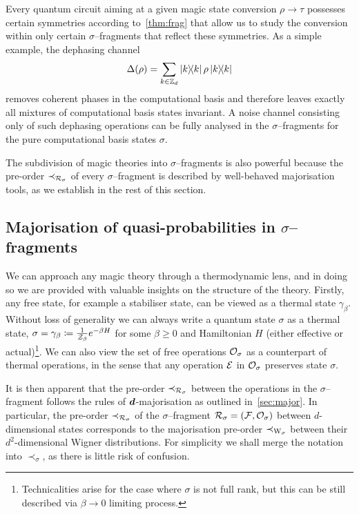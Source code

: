 \documentclass[pra,
aps,
twocolumn,
superscriptaddress,
groupedaddress,
nofootinbib,
reprint
]{revtex4-1}
\begin{document}
Every  quantum circuit aiming at a given magic state conversion $\rho \longrightarrow \tau$ possesses certain symmetries according to~\cref{thm:frag} that allow us to study the conversion within only certain $\sigma$--fragments that reflect these symmetries.
As a simple example, the dephasing channel
\begin{equation}\label{eq:dephase}
	\Delta(\rho) = \sum_{k \in \mathbb{Z}_d} \ketbra{k}{k}\rho\ketbra{k}{k}
\end{equation}
removes coherent phases in the computational basis and therefore leaves exactly all mixtures of computational basis states invariant.
A noise channel consisting only of such dephasing operations can be fully analysed in the $\sigma$--fragments for the pure computational basis states $\sigma$. 

The subdivision of magic theories into $\sigma$--fragments is also powerful because the pre-order $\prec_{\mathcal{R}_\sigma}$ of every $\sigma$--fragment is described by well-behaved majorisation tools, as we establish in the rest of this section.

\subsection{Majorisation of quasi-probabilities in $\sigma$--fragments}\label{sec:major_frag}

We can approach any magic theory through a thermodynamic lens, and in doing so we are provided with valuable insights on the structure of the theory. 
Firstly, any free state, for example a stabiliser state, can be viewed as a thermal state $\gamma_\beta$.
Without loss of generality we can always write a quantum state $\sigma$ as a thermal state, $\sigma = \gamma_\beta \coloneqq \frac{1}{\mathcal{Z}_\beta} e^{-\beta H}$ for some $\beta \geq 0$ and Hamiltonian $H$ (either effective or actual)\footnote{Technicalities arise for the case where $\sigma$ is not full rank, but this can be still described via $ \beta \rightarrow 0$ limiting process.}.
We can also view the set of free operations $\mathcal{O}_\sigma$ as a counterpart of thermal operations, in the sense that any operation $\mathcal{E}$ in $\mathcal{O}_\sigma$ preserves state $\sigma$. 

It is then apparent that the pre-order $\prec_{\mathcal{R}_\sigma}$ between the operations in the $\sigma$--fragment follows the rules of $\bm{d}$-majorisation as outlined in~\cref{sec:major}.
In particular, the pre-order $\prec_{\mathcal{R}_\sigma}$ of the $\sigma$--fragment $\mathcal{R}_\sigma = (\mathcal{F}, \mathcal{O}_\sigma)$ between $d$-dimensional states corresponds to the majorisation pre-order $\prec_{\W{\sigma}}$ between their $d^2$-dimensional Wigner distributions.
For simplicity we shall merge the notation into $\prec_\sigma$, as there is little risk of confusion.
\end{document}
